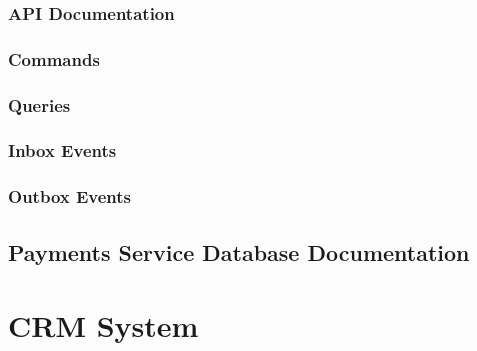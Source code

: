 \documentclass[letterpaper,10pt,english]{sphinxmanual}
\begin{document}


\subsection{API Documentation}
\label{\detokenize{administration_concession_system/orders_service:api-documentation}}

\subsection{Commands}
\label{\detokenize{administration_concession_system/orders_service:commands}}

\subsection{Queries}
\label{\detokenize{administration_concession_system/orders_service:queries}}

\subsection{Inbox Events}
\label{\detokenize{administration_concession_system/orders_service:inbox-events}}

\subsection{Outbox Events}
\label{\detokenize{administration_concession_system/orders_service:outbox-events}}

\section{Payments Service Database Documentation}
\label{\detokenize{administration_concession_system/orders_service:payments-service-database-documentation}}
\sphinxstepscope


\chapter{CRM System}
\label{\detokenize{crm_system/index:crm-system}}\label{\detokenize{crm_system/index::doc}}


\renewcommand{\indexname}{Index}
\printindex
\end{document}
